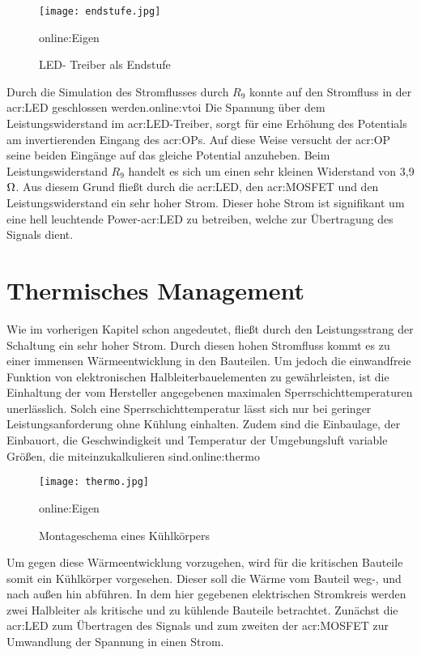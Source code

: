 \begin{figure}[h]
	\centering
	\texttt{[image: endstufe.jpg]}
	\caption[LED- Treiber als Endstufe]{LED- Treiber als Endstufe} \gls{online:Eigen}
	\label{fig:endstufe}
\end{figure}

Durch die Simulation des Stromflusses durch $R_9$ konnte auf den Stromfluss in der \gls{acr:LED} geschlossen werden.\gls{online:vtoi} Die Spannung über dem Leistungswiderstand im \gls{acr:LED}-Treiber, sorgt für eine Erhöhung des Potentials am invertierenden Eingang des \gls{acr:OP}s. Auf diese Weise versucht der \gls{acr:OP} seine beiden Eingänge auf das gleiche Potential anzuheben. Beim Leistungswiderstand $R_{9}$ handelt es sich um einen sehr kleinen Widerstand von 3,9$\ohm$. Aus diesem Grund fließt durch die \gls{acr:LED}, den \gls{acr:MOSFET} und den Leistungswiderstand ein sehr hoher Strom. Dieser hohe Strom ist signifikant um eine hell leuchtende Power-\gls{acr:LED} zu betreiben, welche zur Übertragung des Signals dient.



\newpage
\section{Thermisches Management}
\label{subsub:thermo}
Wie im vorherigen Kapitel schon angedeutet, fließt durch den Leistungsstrang der Schaltung ein sehr hoher Strom. Durch diesen hohen Stromfluss kommt es zu einer immensen Wärmeentwicklung in den Bauteilen. Um jedoch die einwandfreie Funktion von elektronischen Halbleiterbauelementen zu gewährleisten, ist die Einhaltung der vom Hersteller angegebenen maximalen Sperrschichttemperaturen unerlässlich. Solch eine Sperrschichttemperatur lässt sich nur bei geringer Leistungsanforderung ohne Kühlung einhalten. Zudem sind die Einbaulage, der Einbauort, die Geschwindigkeit und Temperatur der Umgebungsluft variable Größen, die miteinzukalkulieren sind.\gls{online:thermo}

\begin{figure}[H]
	\centering
	\texttt{[image: thermo.jpg]}
	\caption[Montageschema eines Kühlkörpers]{Montageschema eines Kühlkörpers} \gls{online:Eigen}
	\label{fig:thermo}
\end{figure}

Um gegen diese Wärmeentwicklung vorzugehen, wird für die kritischen Bauteile somit ein Kühlkörper vorgesehen. Dieser soll die Wärme vom Bauteil weg-, und nach außen hin abführen. In dem hier gegebenen elektrischen Stromkreis werden zwei Halbleiter als kritische und zu kühlende Bauteile betrachtet. Zunächst die \gls{acr:LED} zum Übertragen des Signals und zum zweiten der \gls{acr:MOSFET} zur Umwandlung der Spannung in einen Strom.\cite{thermLED}

